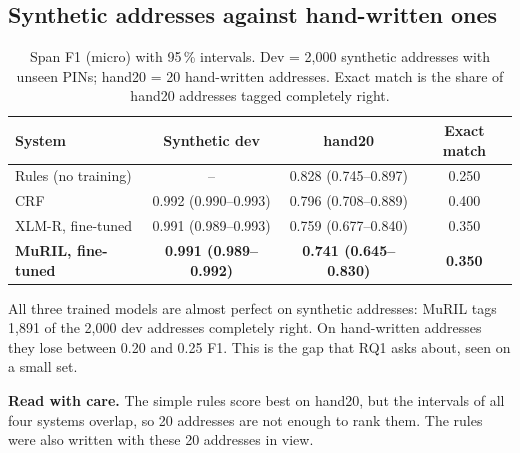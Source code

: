 \documentclass[11pt,a4paper]{article}
\begin{document}
\subsection{Synthetic addresses against hand-written ones}
\begin{table}[H]
\centering\small
\caption[Main results: synthetic dev and hand20]{Span F1 (micro) with 95\,\% intervals. Dev = 2,000 synthetic addresses with unseen PINs; hand20 = 20
hand-written addresses. Exact match is the share of hand20 addresses tagged completely right.}\label{tab:main}
\begin{tabular}{lccc}
\toprule
\textbf{System} & \textbf{Synthetic dev} & \textbf{hand20} & \textbf{Exact match}\\
\midrule
Rules (no training) & -- & 0.828 (0.745--0.897) & 0.250\\
CRF & 0.992 (0.990--0.993) & 0.796 (0.708--0.889) & 0.400\\
\mbox{XLM-R}, fine-tuned & 0.991 (0.989--0.993) & 0.759 (0.677--0.840) & 0.350\\
\textbf{MuRIL, fine-tuned} & \textbf{0.991 (0.989--0.992)} & \textbf{0.741 (0.645--0.830)} & \textbf{0.350}\\
\bottomrule
\end{tabular}
\end{table}

All three trained models are almost perfect on synthetic addresses: MuRIL tags 1,891 of the 2,000 dev addresses
completely right. On hand-written addresses they lose between 0.20 and 0.25 F1. This is the gap that RQ1 asks about,
seen on a small set.

\begin{notebox}
\textbf{\textsf{Read with care.}} The simple rules score best on hand20, but the intervals of all four systems overlap,
so 20 addresses are not enough to rank them. The rules were also written with these 20 addresses in view.
\end{notebox}
\end{document}
